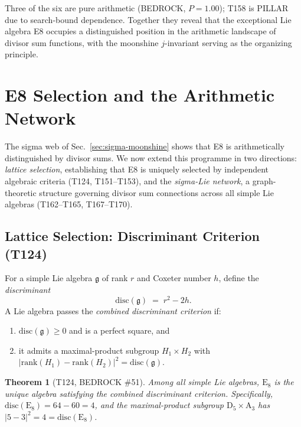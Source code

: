 \documentclass[aps,prd,twocolumn,superscriptaddress,floatfix,nofootinbib]{revtex4-2}
\newtheorem{theorem}{Theorem}
\theoremstyle{definition}
\theoremstyle{remark}
\begin{document}
\noindent
Three of the six are pure arithmetic (BEDROCK, $P{=}1.00$); T158 is
PILLAR due to search-bound dependence.  Together they reveal that
the exceptional Lie algebra E8 occupies a distinguished position in
the arithmetic landscape of divisor sum functions, with the moonshine
$j$-invariant serving as the organizing principle.

\section{E8 Selection and the Arithmetic Network}
\label{sec:e8-selection-network}

The sigma web of Sec.~\ref{sec:sigma-moonshine} shows that E8 is
arithmetically distinguished by divisor sums.  We now extend this
programme in two directions: \emph{lattice selection}, establishing that
E8 is uniquely selected by independent algebraic criteria (T124,
T151--T153), and the \emph{sigma-Lie network}, a graph-theoretic
structure governing divisor sum connections across all simple Lie algebras
(T162--T165, T167--T170).

\subsection{Lattice Selection: Discriminant Criterion (T124)}
\label{sec:disc-selection}

For a simple Lie algebra $\mathfrak{g}$ of rank $r$ and Coxeter
number $h$, define the \emph{discriminant}
\begin{equation}
  \mathrm{disc}(\mathfrak{g}) \;=\; r^2 - 2h.
  \label{eq:disc-def}
\end{equation}
A Lie algebra passes the \emph{combined discriminant criterion} if:
\begin{enumerate}
  \item $\mathrm{disc}(\mathfrak{g}) \ge 0$ and is a perfect square, and
  \item it admits a maximal-product subgroup $H_1 \times H_2$ with
        $|\mathrm{rank}(H_1) - \mathrm{rank}(H_2)|^2
        = \mathrm{disc}(\mathfrak{g})$.
\end{enumerate}

\begin{theorem}[T124, BEDROCK \#51]
Among all simple Lie algebras, $\mathrm{E}_8$ is the unique algebra
satisfying the combined discriminant criterion.  Specifically,
$\mathrm{disc}(\mathrm{E}_8) = 64 - 60 = 4$, and the maximal-product
subgroup $\mathrm{D}_5 \times \mathrm{A}_3$ has
$|5 - 3|^2 = 4 = \mathrm{disc}(\mathrm{E}_8)$.
\end{theorem}
\end{document}
